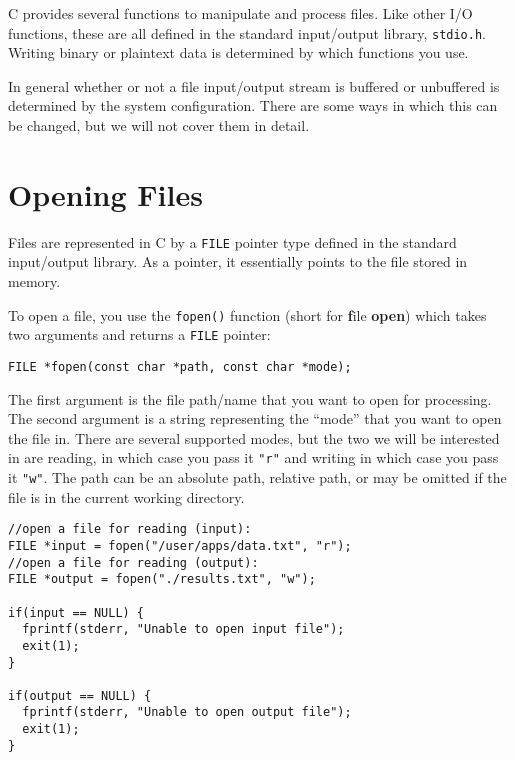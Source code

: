 

C provides several functions to manipulate and
process files.  Like other I/O functions, these
are all defined in the standard input/output
library, \texttt{stdio.h}.  Writing
binary or plaintext data is determined by which
functions you use.

In general whether or not a file input/output
stream is buffered or unbuffered is determined by
the system configuration.  There are some ways
in which this can be changed, but we will not 
cover them in detail.

\section{Opening Files}

Files are represented in C by a \texttt{FILE}
pointer type defined in the standard input/output
library.  As a pointer, it essentially points to the
file stored in memory.

To open a file, you use the \texttt{fopen()} 
function (short for \textbf{f}ile \textbf{open}) which
takes two arguments and returns a \texttt{FILE}
pointer:

\texttt{FILE *fopen(const char *path, const char *mode);}

The first argument is the file path/name that you want
to open for processing.  The second argument is a
string representing the ``mode'' that you want to open the
file in.  There are several supported modes, but the two 
we will be interested in are reading, in which case you
pass it \texttt{"r"} and writing in which case you
pass it \texttt{"w"}.  The path can be an absolute 
path, relative path, or may be omitted if the file is in the
current working directory.

\begin{verbatim}
//open a file for reading (input):
FILE *input = fopen("/user/apps/data.txt", "r");
//open a file for reading (output):
FILE *output = fopen("./results.txt", "w");

if(input == NULL) {
  fprintf(stderr, "Unable to open input file");
  exit(1);
}

if(output == NULL) {
  fprintf(stderr, "Unable to open output file");
  exit(1);
}
\end{verbatim}

